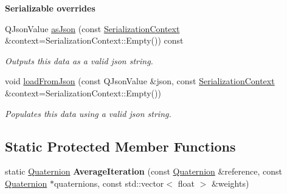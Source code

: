 \begin{Indent}\textbf{ Serializable overrides}\par
\begin{DoxyCompactItemize}
\item 
\mbox{\label{classrev_1_1_quaternion_a644b82e41aa112ff99b66e071aa97fa1}} 
Q\+Json\+Value \mbox{\hyperlink{classrev_1_1_quaternion_a644b82e41aa112ff99b66e071aa97fa1}{as\+Json}} (const \mbox{\hyperlink{structrev_1_1_serialization_context}{Serialization\+Context}} \&context=Serialization\+Context\+::\+Empty()) const
\begin{DoxyCompactList}\small\item\em Outputs this data as a valid json string. \end{DoxyCompactList}\item 
\mbox{\label{classrev_1_1_quaternion_a666c7d70bed999e45b351ffdff82fd63}} 
void \mbox{\hyperlink{classrev_1_1_quaternion_a666c7d70bed999e45b351ffdff82fd63}{load\+From\+Json}} (const Q\+Json\+Value \&json, const \mbox{\hyperlink{structrev_1_1_serialization_context}{Serialization\+Context}} \&context=Serialization\+Context\+::\+Empty())
\begin{DoxyCompactList}\small\item\em Populates this data using a valid json string. \end{DoxyCompactList}\end{DoxyCompactItemize}
\end{Indent}
\subsection*{Static Protected Member Functions}
\begin{DoxyCompactItemize}
\item 
\mbox{\label{classrev_1_1_quaternion_ae636da716645072a4573f9fad8c9b30b}} 
static \mbox{\hyperlink{classrev_1_1_quaternion}{Quaternion}} {\bfseries Average\+Iteration} (const \mbox{\hyperlink{classrev_1_1_quaternion}{Quaternion}} \&reference, const \mbox{\hyperlink{classrev_1_1_quaternion}{Quaternion}} $\ast$quaternions, const std\+::vector$<$ float $>$ \&weights)
\end{DoxyCompactItemize}
